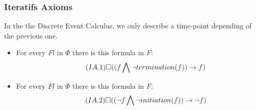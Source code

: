 \subsubsection{Iteratifs Axioms}

In the the Discrete Event Calculus, we only describe a time-point depending of the previous one.

\begin{itemize}
  \item
    For every $Fl$ in $\Phi$ there is this formula in $F$:
    \begin{equation}\tag{$IA.1$}
      \square((f \bigwedge \neg termination(f)) \rightarrow f)
    \end{equation}
  \item
    For every $Fl$ in $\Phi$ there is this formula in $F$:
    \begin{equation}\tag{$IA.2$}
      \square((\neg f \bigwedge \neg initiation(f)) \rightarrow \neg f)
    \end{equation}
\end{itemize}

